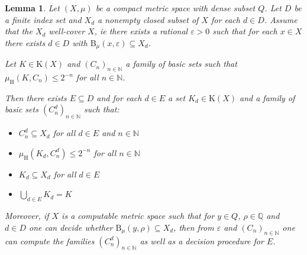 \documentclass[microtype]{jloganal}
\theoremstyle{plain}
\newtheorem{lemma}[theorem]{Lemma}
\theoremstyle{definition}
\newcommand{\NN}{\mathbb{N}}
\newcommand{\QQ}{\mathbb{Q}}
\newcommand{\ball}[3]{\mathrm{B}_{#1}(#2,#3)}
\newcommand{\compact}{\mathrm{K}}
\newcommand{\hdm}{\mu_{\mathrm H}}
\begin{document}
\begin{lemma}
\label{lem-split}
Let $(X,\mu)$ be a compact metric space with dense subset $Q$.  Let $D$ be a
finite index set and $X_d$ a nonempty closed subset of $X$ for each $d\in
D$. Assume that the $X_d$ well-cover $X$, ie there exists a rational 
$\varepsilon>0$ such that for each $x\in X$ there exists $d\in D$ with
$\ball{\mu}{x}{\varepsilon}\subseteq X_d$.

Let $K\in\compact(X)$ and $(C_n)_{n\in\NN}$ a family of basic sets such that 
$\hdm(K,C_n)\le 2^{-n}$ for all $n\in\NN$.

Then there exists $E\subseteq D$ and for each $d\in E$ a set 
$K_d\in\compact(X)$ and a family of basic sets $(C^d_n)_{n\in\NN}$
such that:
\begin{itemize}
\item[-] $C^d_n\subseteq X_d$ for all $d\in E$ and $n\in\NN$
\item[-] $\hdm(K_d,C^d_n)\le 2^{-n}$ for all $n\in\NN$
\item[-] $K_d\subseteq X_d$ for all $d\in E$
\item[-] $\bigcup_{d\in E} K_d = K$
\end{itemize}
Moreover, if $X$ is a computable metric space such that for $y\in Q$, 
$\rho\in\QQ$ and $d\in D$ one can decide whether  
$\ball{\mu}{y}{\rho}\subseteq X_d$, then from $\varepsilon$ 
and $(C_n)_{n\in\NN}$ one can compute the families $(C^d_n)_{n\in\NN}$ as well as
a decision procedure for $E$.

\end{lemma}
\end{document}
